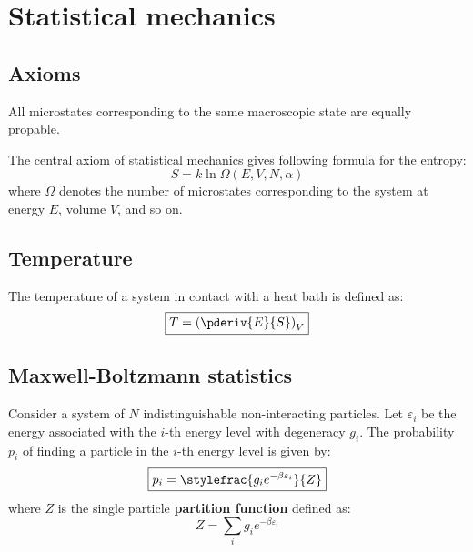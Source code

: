 \chapter{Statistical mechanics}

\section{Axioms}
    
    \begin{theorem}
    	All microstates corresponding to the same macroscopic state are equally propable.
    \end{theorem}
	\begin{theorem}
    	The central axiom of statistical mechanics gives following formula for the entropy:
		\begin{equation}
			\label{statmech:boltzmann_formula}
            \boxed{S = k\ln\Omega(E, V, N, \alpha)}
		\end{equation}
        where $\Omega$ denotes the number of microstates corresponding to the system at energy $E$, volume $V$, and so on.
	\end{theorem}
    
	\section{Temperature}
    	The temperature of a system in contact with a heat bath is defined as:
    	\begin{equation}
        	\label{statmech:temperature}
			\boxed{T = \left(\pderiv{E}{S}\right)_V}
		\end{equation}
    
\section{Maxwell-Boltzmann statistics}

	\label{statmech:partition_function}
    	Consider a system of $N$ indistinguishable non-interacting particles. Let $\varepsilon_i$ be the energy associated with the $i$-th energy level with degeneracy $g_i$. The probability $p_i$ of finding a particle in the $i$-th energy level is given by:
    	\begin{equation}
		\boxed{p_i = \stylefrac{g_i e^{-\beta\varepsilon_i}}{Z}}
	\end{equation}
        where $Z$ is the single particle \textbf{partition function} defined as:
        \begin{equation}
	        \boxed{Z = \sum_i{g_ie^{-\beta\varepsilon_i}}}
	\end{equation}
        
